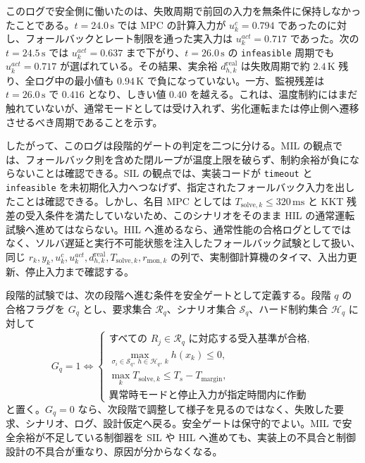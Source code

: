 このログで安全側に働いたのは、失敗周期で前回の入力を無条件に保持しなかったことである。$t=24.0\,\mathrm{s}$ では MPC の計算入力が $u_k^c=0.794$ であったのに対し、フォールバックとレート制限を通った実入力は $u_k^{act}=0.717$ であった。次の $t=24.5\,\mathrm{s}$ では $u_k^{act}=0.637$ まで下がり、$t=26.0\,\mathrm{s}$ の \texttt{infeasible} 周期でも $u_k^{act}=0.717$ が選ばれている。その結果、実余裕 $d_{h,k}^{\mathrm{real}}$ は失敗周期で約 $2.4\,\mathrm{K}$ 残り、全ログ中の最小値も $0.94\,\mathrm{K}$ で負になっていない。一方、監視残差は $t=26.0\,\mathrm{s}$ で $0.416$ となり、しきい値 $0.40$ を越える。これは、温度制約にはまだ触れていないが、通常モードとしては受け入れず、劣化運転または停止側へ遷移させるべき周期であることを示す。

したがって、このログは段階的ゲートの判定を二つに分ける。MIL の観点では、フォールバック則を含めた閉ループが温度上限を破らず、制約余裕が負にならないことは確認できる。SIL の観点では、実装コードが \texttt{timeout} と \texttt{infeasible} を未初期化入力へつなげず、指定されたフォールバック入力を出したことは確認できる。しかし、名目 MPC としては $T_{\mathrm{solve},k}\le320\,\mathrm{ms}$ と KKT 残差の受入条件を満たしていないため、このシナリオをそのまま HIL の通常運転試験へ進めてはならない。HIL へ進めるなら、通常性能の合格ログとしてではなく、ソルバ遅延と実行不可能状態を注入したフォールバック試験として扱い、同じ $r_k,y_k,u_k^c,u_k^{act},d_{h,k}^{\mathrm{real}},T_{\mathrm{solve},k},r_{\mathrm{mon},k}$ の列で、実制御計算機のタイマ、入出力更新、停止入力まで確認する。

段階的試験では、次の段階へ進む条件を安全ゲートとして定義する。段階 $q$ の合格フラグを $G_q$ とし、要求集合 $\mathcal{R}_q$、シナリオ集合 $\mathcal{S}_q$、ハード制約集合 $\mathcal{H}_q$ に対して
\begin{equation}
  G_q=1
  \Longleftrightarrow
  \begin{cases}
    \text{すべての } R_j\in\mathcal{R}_q \text{ に対応する受入基準が合格},\\
    \max_{\sigma_i\in\mathcal{S}_q,\ h\in\mathcal{H}_q,\ k} h(x_k)\le0,\\
    \max_k T_{\mathrm{solve},k}\le T_s-T_{\mathrm{margin}},\\
    \text{異常時モードと停止入力が指定時間内に作動}
  \end{cases}
\end{equation}
と置く。$G_q=0$ なら、次段階で調整して様子を見るのではなく、失敗した要求、シナリオ、ログ、設計仮定へ戻る。安全ゲートは保守的でよい。MIL で安全余裕が不足している制御器を SIL や HIL へ進めても、実装上の不具合と制御設計の不具合が重なり、原因が分からなくなる。

